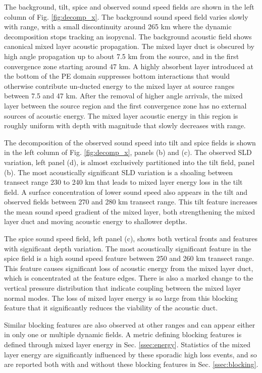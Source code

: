\documentclass[preprint,NumberedRefs]{JASA}
\begin{document}
The background, tilt, spice and observed sound speed fields are shown in the left column of Fig. \ref{fig:decomp_x}. The background sound speed field varies slowly with range, with a small discontinuity around 265 km where the dynamic decomposition stops tracking an isopycnal. The background acoustic field shows canonical mixed layer acoustic propagation. The mixed layer duct is obscured by high angle propagation up to about 7.5 km from the source, and in the first convergence zone starting around 47 km. A highly absorbent layer introduced at the bottom of the PE domain suppresses bottom interactions that would otherwise contribute un-ducted energy to the mixed layer at source ranges between 7.5 and 47 km. After the removal of higher angle arrivals, the mixed layer between the source region and the first convergence zone has no external sources of acoustic energy. The mixed layer acoustic energy in this region is roughly uniform with depth with magnitude that slowly decreases with range.

The decomposition of the observed sound speed into tilt and spice fields is shown in the left column of Fig. \ref{fig:decomp_x}, panels (b) and (c). The observed SLD variation, left panel (d), is almost exclusively partitioned into the tilt field, panel (b). The most acoustically significant SLD variation is a shoaling between transect range 230 to 240 km that leads to mixed layer energy loss in the tilt field. A surface concentration of lower sound speed also appears in the tilt and observed fields between 270 and 280 km transect range. This tilt feature increases the mean sound speed gradient of the mixed layer, both strengthening the mixed layer duct and moving acoustic energy to shallower depths.

The spice sound speed field, left panel (c), shows both vertical fronts and features with significant depth variation. The most acoustically significant feature in the spice field is a high sound speed feature between 250 and 260 km transect range. This feature causes significant loss of acoustic energy from the mixed layer duct, which is concentrated at the feature edges. There is also a marked change to the vertical pressure distribution that indicate coupling between the mixed layer normal modes. The loss of mixed layer energy is so large from this blocking feature that it significantly reduces the viability of the acoustic duct.

Similar blocking features are also observed at other ranges and can appear either in only one or multiple dynamic fields. A metric defining blocking features is defined through mixed layer energy in Sec. \ref{ssec:energy}. Statistics of the mixed layer energy are significantly influenced by these sporadic high loss events, and so are reported both with and without these blocking features in Sec. \ref{ssec:blocking}.
\end{document}
